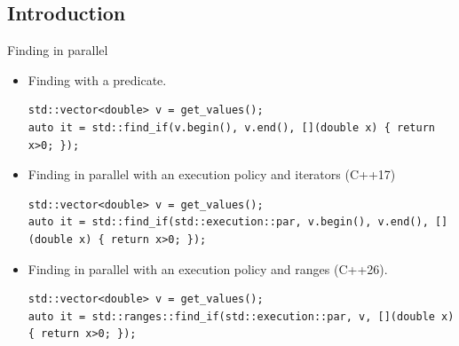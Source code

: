 \subsection{Introduction}

\begin{frame}[t,fragile]{Finding in parallel}
\begin{itemize}

\item Finding with a predicate.

\begin{lstlisting}
std::vector<double> v = get_values();
auto it = std::find_if(v.begin(), v.end(), [](double x) { return x>0; });
\end{lstlisting}

\item Finding in parallel with an execution policy and iterators (C++17)

\begin{lstlisting}
std::vector<double> v = get_values();
auto it = std::find_if(std::execution::par, v.begin(), v.end(), [](double x) { return x>0; });
\end{lstlisting}

\item Finding in parallel with an execution policy and ranges (C++26).
\begin{lstlisting}
std::vector<double> v = get_values();
auto it = std::ranges::find_if(std::execution::par, v, [](double x) { return x>0; });
\end{lstlisting}

\end{itemize}
\end{frame}


